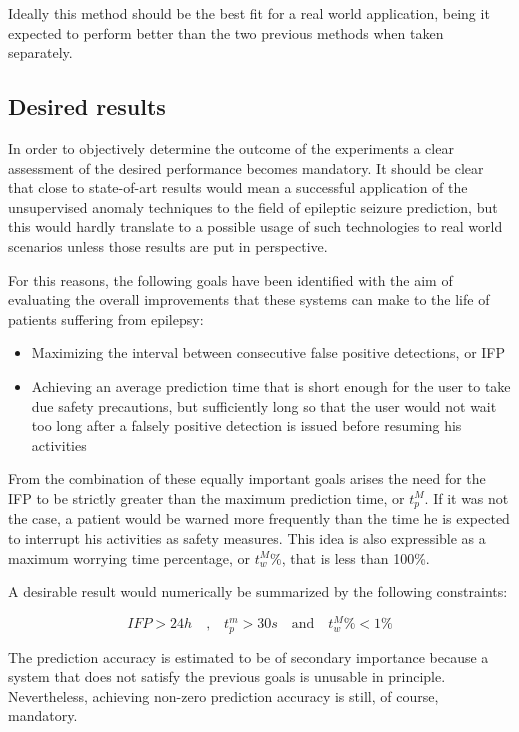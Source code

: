 Ideally this method should be the best fit for a real world application, being it expected to perform better than the two previous methods when taken separately.

\subsection{Desired results}
In order to objectively determine the outcome of the experiments a clear assessment of the desired performance becomes mandatory.
It should be clear that close to state-of-art results would mean a successful application of the unsupervised anomaly techniques to the field of epileptic seizure prediction, but this would hardly translate to a possible usage of such technologies to real world scenarios unless those results are put in perspective.

For this reasons, the following goals have been identified with the aim of evaluating the overall improvements that these systems can make to the life of patients suffering from epilepsy:

\begin{itemize}
    \item Maximizing the interval between consecutive false positive detections, or \gls{IFP}
    \item Achieving an average prediction time that is short enough for the user to take due safety precautions, but sufficiently long so that the user would not wait too long after a falsely positive detection is issued before resuming his activities
\end{itemize}

From the combination of these equally important goals arises the need for the \gls{IFP} to be strictly greater than the maximum prediction time, or $t_p^M$. If it was not the case, a patient would be warned more frequently than the time he is expected to interrupt his activities as safety measures.
This idea is also expressible as a maximum worrying time percentage, or $t_w^M\%$, that is less than 100\%.

A desirable result would numerically be summarized by the following constraints:

\begin{equation} \label{eq:app-constraints}
    IFP > 24 h
    \quad\text{,}\quad 
    t_p^m > 30 s
    \quad\text{and}\quad
    t_w^M\% < 1\%
\end{equation}

The prediction accuracy is estimated to be of secondary importance because a system that does not satisfy the previous goals is unusable in principle. Nevertheless, achieving non-zero prediction accuracy is still, of course, mandatory.

